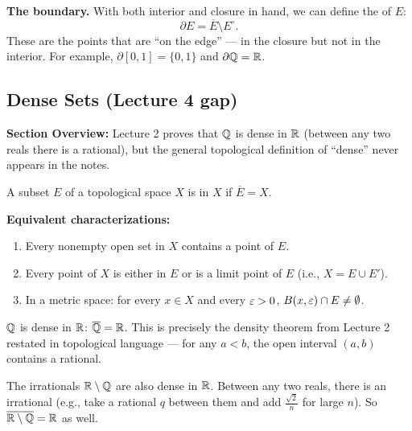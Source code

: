 \documentclass[../master/master.tex]{subfiles}
\begin{document}
\begin{notebox}
\textbf{The boundary.} With both interior and closure in hand, we can define the  of $E$:
\[
    \partial E = \overline{E} \setminus E^\circ.
\]
These are the points that are ``on the edge'' --- in the closure but not in the interior. For example, $\partial [0,1] = \{0, 1\}$ and $\partial \mathbb{Q} = \mathbb{R}$.
\end{notebox}

\newpage
\subsection{Dense Sets (Lecture 4 gap)}

\begin{summarybox}
\textbf{Section Overview:} Lecture 2 proves that $\mathbb{Q}$ is dense in $\mathbb{R}$ (between any two reals there is a rational), but the general topological definition of ``dense'' never appears in the notes.
\end{summarybox}

\begin{definition}
A subset $E$ of a topological space $X$ is  in $X$ if $\overline{E} = X$.
\end{definition}

\textbf{Equivalent characterizations:}
\begin{enumerate}
    \item Every nonempty open set in $X$ contains a point of $E$.
    \item Every point of $X$ is either in $E$ or is a limit point of $E$ (i.e., $X = E \cup E'$).
    \item In a metric space: for every $x \in X$ and every $\varepsilon > 0$, $B(x, \varepsilon) \cap E \neq \emptyset$.
\end{enumerate}

\begin{example}
$\mathbb{Q}$ is dense in $\mathbb{R}$: $\overline{\mathbb{Q}} = \mathbb{R}$. This is precisely the density theorem from Lecture 2 restated in topological language --- for any $a < b$, the open interval $(a, b)$ contains a rational.
\end{example}

\begin{example}
The irrationals $\mathbb{R} \setminus \mathbb{Q}$ are also dense in $\mathbb{R}$. Between any two reals, there is an irrational (e.g., take a rational $q$ between them and add $\frac{\sqrt{2}}{n}$ for large $n$). So $\overline{\mathbb{R} \setminus \mathbb{Q}} = \mathbb{R}$ as well.
\end{example}
\end{document}
